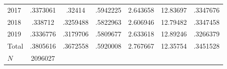 {\begin{longtable}{l*{1}{cccccc}}
2017        &    .3373061&      .32414&    .5942225&    2.643658&    12.83697&    .3347676\\
2018        &     .338712&    .3259488&    .5822963&    2.606946&    12.79482&    .3347458\\
2019        &    .3336776&    .3179706&    .5809677&    2.633618&    12.89246&    .3266379\\
Total       &    .3805616&    .3672558&    .5920008&    2.767667&    12.35754&    .3451528\\
\hline
\(N\)       &     2096027&            &            &            &            &            \\
\hline\hline
\end{longtable}
}
